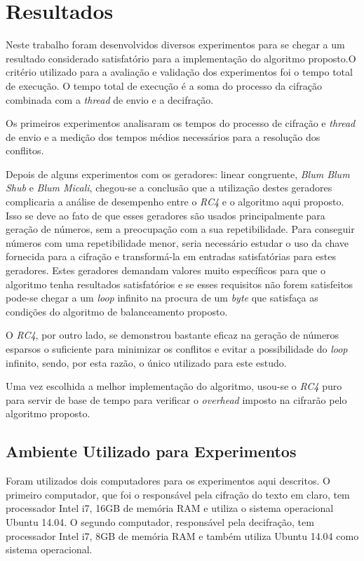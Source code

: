 \chapter{Resultados}
\label{results}

Neste trabalho foram desenvolvidos diversos experimentos para se chegar a um resultado considerado satisfatório para a implementação do algoritmo proposto.O critério utilizado para a avaliação e validação dos experimentos foi o tempo total de execução. O tempo total de execução é a soma do processo da cifração combinada com a \textit{thread} de envio e a decifração. 

Os primeiros experimentos analisaram os tempos do processo de cifração e \textit{thread} de envio e a medição dos tempos médios necessários para a resolução dos conflitos.

Depois de alguns experimentos com os geradores: linear congruente, \textit{Blum Blum Shub} e \textit{Blum Micali}, chegou-se a conclusão que a utilização destes geradores complicaria a análise de desempenho entre o \textit{RC4} e o algoritmo aqui proposto. Isso se deve ao fato de que esses geradores são usados principalmente para geração de números, sem a preocupação com a sua repetibilidade. Para conseguir números com uma repetibilidade menor, seria necessário estudar o uso da chave fornecida para a cifração e transformá-la em entradas satisfatórias para estes geradores. Estes geradores demandam valores muito específicos para que o algoritmo tenha resultados satisfatórios e se esses requisitos não forem satisfeitos pode-se chegar a um \textit{loop} infinito na procura de um \textit{byte} que satisfaça as condições do algoritmo de balanceamento proposto.

O \textit{RC4}, por outro lado, se demonstrou bastante eficaz na geração de números esparsos o suficiente para minimizar os conflitos e evitar a possibilidade do \textit{loop} infinito, sendo, por esta razão, o único utilizado para este estudo.

Uma vez escolhida a melhor implementação do algoritmo, usou-se o \textit{RC4} puro para servir de base de tempo para verificar o \textit{overhead} imposto na cifrarão pelo algoritmo proposto.


\section{Ambiente Utilizado para Experimentos}

Foram utilizados dois computadores para os experimentos aqui descritos. O primeiro computador, que foi o responsável pela cifração do texto em claro, tem processador Intel i7, 16GB de memória RAM e utiliza o sistema operacional Ubuntu 14.04. O segundo computador, responsável pela decifração, tem processador Intel i7, 8GB de memória RAM e também utiliza Ubuntu 14.04 como sistema operacional.

